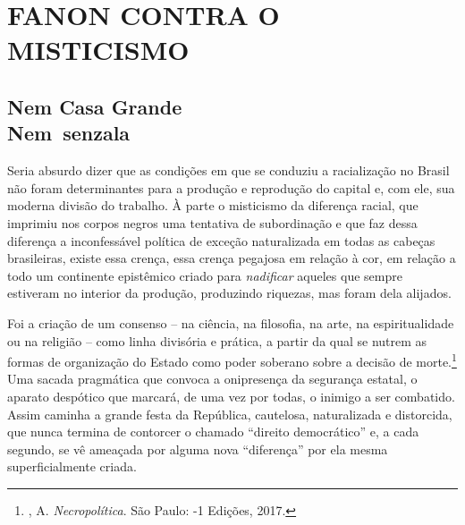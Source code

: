 \part{FANON CONTRA O MISTICISMO}
\removeepigraph

\chapter*{Nem Casa Grande\\ Nem~senzala}

Seria absurdo dizer que as condições em que se conduziu a racialização
no Brasil não foram determinantes para a produção e reprodução do
capital e, com ele, sua moderna divisão do trabalho. À parte o
misticismo da diferença racial, que imprimiu nos corpos negros uma
tentativa de subordinação e que faz dessa diferença a inconfessável
política de exceção naturalizada em todas as cabeças brasileiras, existe
essa crença, essa crença pegajosa em relação à cor, em relação a todo um
continente epistêmico criado para \emph{nadificar} aqueles que sempre
estiveram no interior da produção, produzindo riquezas, mas foram dela
alijados.

Foi a criação de um consenso -- na ciência, na filosofia, na arte, na
espiritualidade ou na religião -- como linha divisória e prática, a
partir da qual se nutrem as formas de organização do Estado como poder
soberano sobre a decisão de morte.\footnote{, A. \emph{Necropolítica}. São Paulo: -1 Edições, 2017.} Uma sacada pragmática que convoca a onipresença da segurança estatal, o aparato
despótico que marcará, de uma vez por todas, o inimigo a ser combatido.
Assim caminha a grande festa da República, cautelosa, naturalizada e
distorcida, que nunca termina de contorcer o chamado ``direito
democrático'' e, a cada segundo, se vê ameaçada por alguma nova
``diferença'' por ela mesma superficialmente criada.

